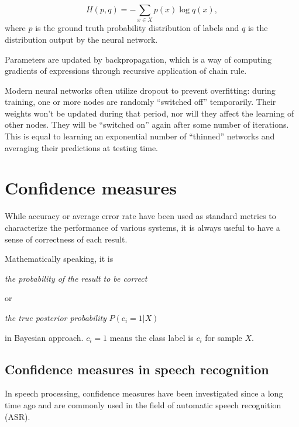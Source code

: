 \documentclass[11pt,a4paper]{report}
\begin{document}
\begin{equation}
  H(p, q) = - \sum_{x \in X} p(x) \log q(x),
\end{equation}
where \(p\) is the ground truth probability distribution of labels and \(q\) is the distribution output by the neural network.

\bigskip

Parameters are updated by backpropagation, which is a way of computing gradients of expressions through recursive application of chain rule.

Modern neural networks often utilize dropout \parencite{srivastava2014dropout} to prevent overfitting: during training, one or more nodes are randomly \enquote{switched off} temporarily.
Their weights won't be updated during that period, nor will they affect the learning of other nodes.
They will be \enquote{switched on} again after some number of iterations.
This is equal to learning an exponential number of \enquote{thinned} networks and averaging their predictions at testing time.

\newpage

\section{Confidence measures}

While accuracy or average error rate have been used as standard metrics to characterize the performance of various systems, it is always useful to have a sense of correctness of each result.

\bigskip

Mathematically speaking, it is

\begin{center}
  \textit{the probability of the result to be correct}
\end{center}

or

\begin{center}
  \textit{the true posterior probability} \(P (c_i = 1 | X)\)
\end{center}

in Bayesian approach.
\(c_i = 1\) means the class label is \(c_i\) for sample \(X\).

\subsection{Confidence measures in speech recognition}

In speech processing, confidence measures have been investigated since a long time ago and are commonly used in the field of automatic speech recognition (ASR).
\end{document}
